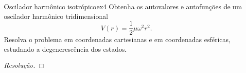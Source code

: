\begin{exercício}{Oscilador harmônico isotrópico}{ex4}
    Obtenha os autovalores e autofunções de um oscilador harmônico tridimensional
    \begin{equation*}
        V(r) = \frac12 \mu \omega^2 r^2. 
    \end{equation*}
    Resolva o problema em coordenadas cartesianas e em coordenadas esféricas, estudando a degenerescência dos estados.
\end{exercício}
\begin{proof}[Resolução]
    
\end{proof}
